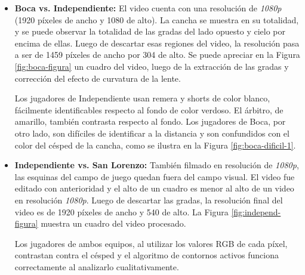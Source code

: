 \begin{itemize}

  \item \textbf{Boca vs. Independiente:} El video cuenta con una resolución de
    \textit{1080p} (1920 píxeles de ancho y 1080 de alto). La cancha se muestra
    en su totalidad, y se puede observar la totalidad de las gradas del lado
    opuesto y cielo por encima de ellas. Luego de descartar esas regiones del
    video, la resolución pasa a ser de 1459 píxeles de ancho por 304 de alto.
    Se puede apreciar en la Figura \ref{fig:boca-figura} un cuadro del video, luego
    de la extracción de las gradas y corrección del efecto de curvatura de la
    lente.

    Los jugadores de Independiente usan remera y shorts de color blanco,
    fácilmente identificables respecto al fondo de color verdoso. El árbitro, de
    amarillo, también contrasta respecto al fondo. Los jugadores de Boca, por
    otro lado, son difíciles de identificar a la distancia y son confundidos con
    el color del césped de la cancha, como se ilustra en la Figura \ref{fig:boca-dificil-1}.

  \item \textbf{Independiente vs. San Lorenzo:} También filmado en resolución de
      \textit{1080p}, las esquinas del campo de juego quedan fuera del campo
      visual. El video fue editado con anterioridad y el alto de un cuadro es
      menor al alto de un video en resolución \textit{1080p}. Luego de descartar
      las gradas, la resolución final del video es de 1920 píxeles de ancho y
      540 de alto. La Figura \ref{fig:independ-figura} muestra un cuadro del
      video procesado.

    Los jugadores de ambos equipos, al utilizar los valores RGB de cada píxel,
    contrastan contra el césped y el algoritmo de contornos activos funciona
    correctamente al analizarlo cualitativamente.

\end{itemize}

